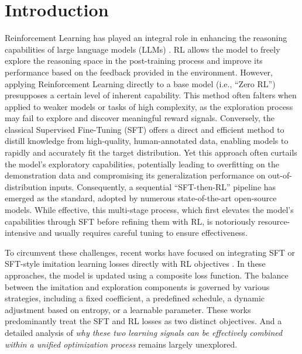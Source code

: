 \section{Introduction}




Reinforcement Learning has played an integral role in enhancing the reasoning capabilities of large language models (LLMs) \citep{jaech2024openai, team2025kimi, guo2025deepseek}.
RL allows the model to freely explore the reasoning space in the post-training process and improve its performance based on the feedback provided in the environment. 
However, applying Reinforcement Learning directly to a base model (i.e., ``Zero RL'') \citep{zeng2025simplerlzooinvestigatingtamingzero} presupposes a certain level of inherent capability. This method often falters when applied to weaker models or tasks of high complexity, as the exploration process may fail to explore and discover meaningful reward signals. 
Conversely, the classical Supervised Fine-Tuning (SFT) \citep{wei2021finetuned} offers a direct and efficient method to distill knowledge from high-quality, human-annotated data, enabling models to rapidly and accurately fit the target distribution. Yet this approach often curtails the model's exploratory capabilities, potentially leading to overfitting on the demonstration data and compromising its generalization performance on out-of-distribution inputs. 
Consequently, a sequential ``SFT-then-RL'' pipeline \citep{yoshihara2025practical} has emerged as the standard, adopted by numerous state-of-the-art open-source models. While effective, this multi-stage process, which first elevates the model's capabilities through SFT before refining them with RL, is notoriously resource-intensive and usually requires careful tuning to ensure effectiveness.


To circumvent these challenges, recent works have focused on integrating SFT or SFT-style imitation learning losses directly with RL objectives \citep{yan2025learning, fu2025srft, zhang2025on}.
In these approaches, the model is updated using a composite loss function. The balance between the imitation and exploration components is governed by various strategies, including a fixed coefficient, a predefined schedule, a dynamic adjustment based on entropy, or a learnable parameter. 
These works predominantly treat the SFT and RL losses as two distinct objectives. And a detailed analysis of \textit{why these two learning signals can be effectively combined within a unified optimization process} remains largely unexplored.

